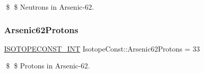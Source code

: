 \$ \$ Neutrons in Arsenic-\/62. \mbox{\label{group___isotope_const-_arsenic-_as62_gae050457fd05cebffdc014c7798f54460}} 
\subsubsection{\texorpdfstring{Arsenic62\+Protons}{Arsenic62Protons}}
{\footnotesize\ttfamily \mbox{\hyperlink{group___isotope_const-_macros_ga5f18360b3e99483a35c32d789e62621c}{I\+S\+O\+T\+O\+P\+E\+C\+O\+N\+S\+T\+\_\+\+I\+NT}} Isotope\+Const\+::\+Arsenic62\+Protons = 33}

\$ \$ Protons in Arsenic-\/62. 